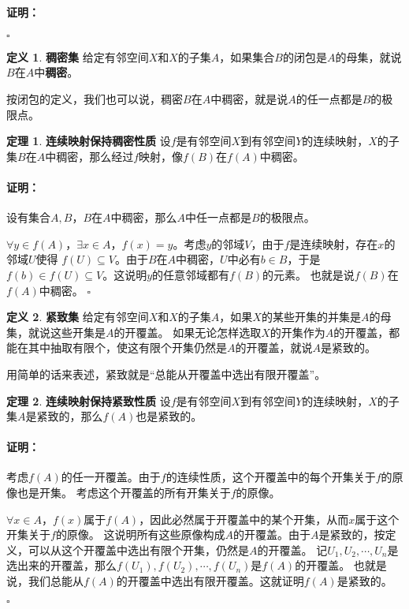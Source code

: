 \documentclass[12pt,UTF8]{ctexbook}
\theoremstyle{definition}
\newtheorem{df}{定义}[section]
\newtheorem{tm}{定理}[section]
\theoremstyle{plain}
\renewenvironment{proof}{\paragraph{\textbf{证明：}}}{\hfill$\square$}
\begin{document}
\begin{appendix}
\begin{proof}
\end{proof}

\begin{df}{\textbf{稠密集}}
    给定有邻空间$X$和$X$的子集$A$，如果集合$B$的闭包是$A$的母集，就说$B$在$A$中\textbf{稠密}。
\end{df}

按闭包的定义，我们也可以说，稠密$B$在$A$中稠密，就是说$A$的任一点都是$B$的极限点。

\begin{tm}{\textbf{连续映射保持稠密性质}}
    设$f$是有邻空间$X$到有邻空间$Y$的连续映射，$X$的子集$B$在$A$中稠密，那么经过$f$映射，像$f(B)$在$f(A)$中稠密。
\end{tm}

\begin{proof}
    设有集合$A,B$，$B$在$A$中稠密，那么$A$中任一点都是$B$的极限点。

    $\forall y\in f(A)$，$\exists x\in A$，$f(x) = y$。考虑$y$的邻域$V$，由于$f$是连续映射，存在$x$的邻域$U$使得
    $f(U)\subseteq V$。由于$B$在$A$中稠密，$U$中必有$b\in B$，于是$f(b)\in f(U) \subseteq V$。这说明$y$的任意邻域都有$f(B)$的元素。
    也就是说$f(B)$在$f(A)$中稠密。
\end{proof}

\begin{df}{\textbf{紧致集}}
    给定有邻空间$X$和$X$的子集$A$，如果$X$的某些开集的并集是$A$的母集，就说这些开集是$A$的开覆盖。
    如果无论怎样选取$X$的开集作为$A$的开覆盖，都能在其中抽取有限个，使这有限个开集仍然是$A$的开覆盖，就说$A$是紧致的。
\end{df}

用简单的话来表述，紧致就是“总能从开覆盖中选出有限开覆盖”。

\begin{tm}{\textbf{连续映射保持紧致性质}}
    设$f$是有邻空间$X$到有邻空间$Y$的连续映射，$X$的子集$A$是紧致的，那么$f(A)$也是紧致的。
\end{tm}

\begin{proof}
    考虑$f(A)$的任一开覆盖。由于$f$的连续性质，这个开覆盖中的每个开集关于$f$的原像也是开集。
    考虑这个开覆盖的所有开集关于$f$的原像。

    $\forall x\in A$，$f(x)$属于$f(A)$，因此必然属于开覆盖中的某个开集，从而$x$属于这个开集关于$f$的原像。
    这说明所有这些原像构成$A$的开覆盖。由于$A$是紧致的，按定义，可以从这个开覆盖中选出有限个开集，仍然是$A$的开覆盖。
    记$U_1, U_2, \cdots, U_n$是选出来的开覆盖，那么$f(U_1), f(U_2), \cdots , f(U_n)$是$f(A)$的开覆盖。
    也就是说，我们总能从$f(A)$的开覆盖中选出有限开覆盖。这就证明$f(A)$是紧致的。


\end{proof}
\end{appendix}
\end{document}

